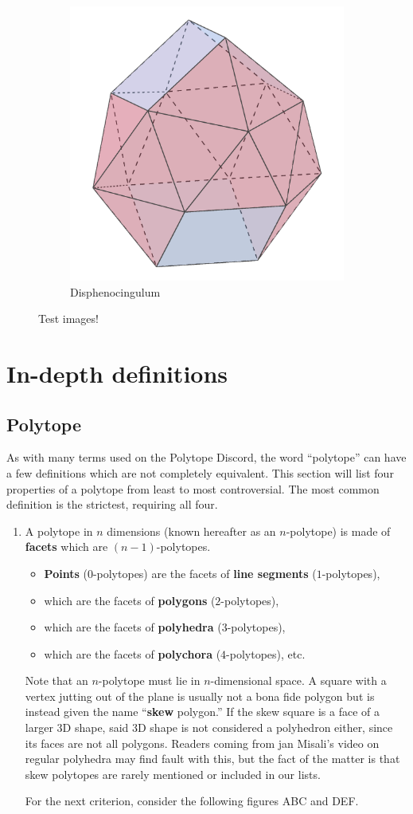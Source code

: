 \documentclass{article}
\begin{document}
\begin{figure}[h]
\begin{subfigure}{.33333\textwidth}
    \centering
    \includegraphics[width=.5\linewidth]{Disphenocingulum}
    \caption{Disphenocingulum}
    \label{fig:polyhedra_3}
  \end{subfigure}%
  \caption{Test images!}
  \label{fig:polyhedra}
\end{figure}

\section{In-depth definitions}
\label{indepth}
\subsection{Polytope}
As with many terms used on the Polytope Discord,
the word ``polytope'' can have a few definitions which are not completely equivalent.
This section will list four properties of a polytope from least to most controversial.
The most common definition is the strictest, requiring all four.
\begin{enumerate}
  \item
A polytope in $n$ dimensions (known hereafter as an $n$-polytope)
is made of \textbf{facets} which are $(n-1)$-polytopes.
\begin{itemize}
\item \textbf{Points} ($0$-polytopes) are the facets of \textbf{line segments} ($1$-polytopes),
\item which are the facets of \textbf{polygons} ($2$-polytopes),
\item which are the facets of \textbf{polyhedra} ($3$-polytopes),
\item which are the facets of \textbf{polychora} ($4$-polytopes), etc.
\end{itemize}

Note that an $n$-polytope must lie in $n$-dimensional space.
A square with a vertex jutting out of the plane is usually not a bona fide polygon
but is instead given the name ``\textbf{skew} polygon.''
If the skew square is a face of a larger 3D shape,
said 3D shape is not considered a polyhedron either,
since its faces are not all polygons.
Readers coming from jan Misali's video on regular polyhedra may find fault with this,
but the fact of the matter is that
skew polytopes are rarely mentioned or included in our lists.

For the next criterion, consider the following figures ABC and DEF.
\end{enumerate}
\end{document}
